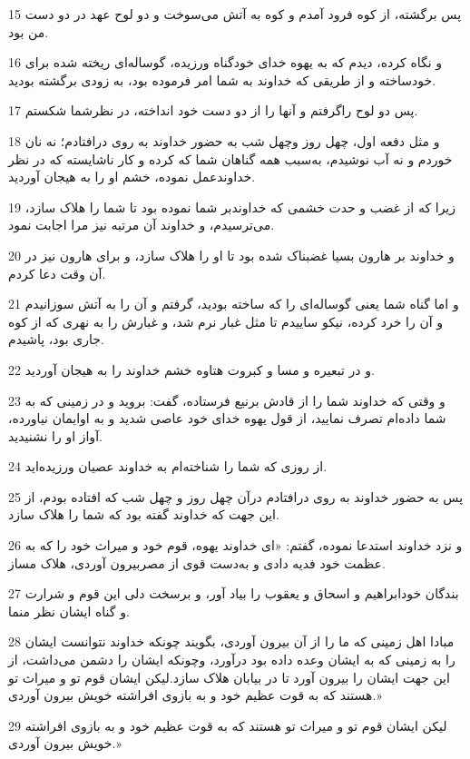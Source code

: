 \par 15 پس برگشته، از کوه فرود آمدم و کوه به آتش می‌سوخت و دو لوح عهد در دو دست من بود.
\par 16 و نگاه کرده، دیدم که به یهوه خدای خودگناه ورزیده، گوساله‌ای ریخته شده برای خودساخته و از طریقی که خداوند به شما امر فرموده بود، به زودی برگشته بودید.
\par 17 پس دو لوح راگرفتم و آنها را از دو دست خود انداخته، در نظرشما شکستم.
\par 18 و مثل دفعه اول، چهل روز وچهل شب به حضور خداوند به روی درافتادم؛ نه نان خوردم و نه آب نوشیدم، به‌سبب همه گناهان شما که کرده و کار ناشایسته که در نظر خداوندعمل نموده، خشم او را به هیجان آوردید.
\par 19 زیرا که از غضب و حدت خشمی که خداوندبر شما نموده بود تا شما را هلاک سازد، می‌ترسیدم، و خداوند آن مرتبه نیز مرا اجابت نمود.
\par 20 و خداوند بر هارون بسیا غضبناک شده بود تا او را هلاک سازد، و برای هارون نیز در آن وقت دعا کردم.
\par 21 و اما گناه شما یعنی گوساله‌ای را که ساخته بودید، گرفتم و آن را به آتش سوزانیدم و آن را خرد کرده، نیکو ساییدم تا مثل غبار نرم شد، و غبارش را به نهری که از کوه جاری بود، پاشیدم.
\par 22 و در تبعیره و مسا و کبروت هتاوه خشم خداوند را به هیجان آوردید.
\par 23 و وقتی که خداوند شما را از قادش برنیع فرستاده، گفت: بروید و در زمینی که به شما داده‌ام تصرف نمایید، از قول یهوه خدای خود عاصی شدید و به اوایمان نیاورده، آواز او را نشنیدید.
\par 24 از روزی که شما را شناخته‌ام به خداوند عصیان ورزیده‌اید.
\par 25 پس به حضور خداوند به روی درافتادم درآن چهل روز و چهل شب که افتاده بودم، از این جهت که خداوند گفته بود که شما را هلاک سازد.
\par 26 و نزد خداوند استدعا نموده، گفتم: «ای خداوند یهوه، قوم خود و میراث خود را که به عظمت خود فدیه دادی و به‌دست قوی از مصربیرون آوردی، هلاک مساز.
\par 27 بندگان خودابراهیم و اسحاق و یعقوب را بیاد آور، و برسخت دلی این قوم و شرارت و گناه ایشان نظر منما.
\par 28 مبادا اهل زمینی که ما را از آن بیرون آوردی، بگویند چونکه خداوند نتوانست ایشان را به زمینی که به ایشان وعده داده بود درآورد، وچونکه ایشان را دشمن می‌داشت، از این جهت ایشان را بیرون آورد تا در بیابان هلاک سازد.لیکن ایشان قوم تو و میراث تو هستند که به قوت عظیم خود و به بازوی افراشته خویش بیرون آوردی.»
\par 29 لیکن ایشان قوم تو و میراث تو هستند که به قوت عظیم خود و به بازوی افراشته خویش بیرون آوردی.»
 
